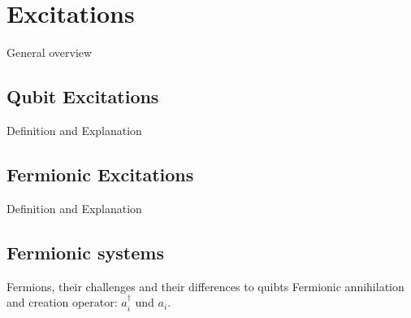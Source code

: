 \chapter{Excitations}
\label{c:excitations}



General overview

\section{Qubit Excitations}
Definition and Explanation

\section{Fermionic Excitations}
Definition and Explanation

\section{Fermionic systems}
\begin{outline}
	\1 Fermions, their challenges and their differences to quibts 
	\1 Fermionic annihilation and creation operator: $a_i^\dagger$ und $a_i$.
\end{outline}
